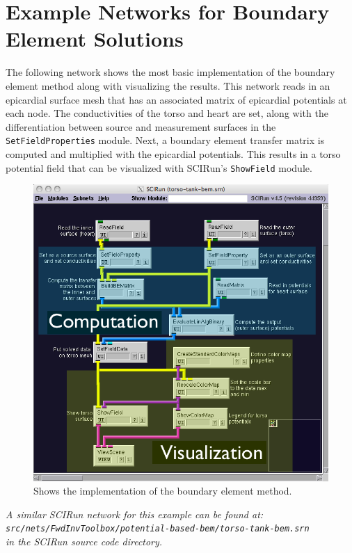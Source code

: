 \section{Example Networks for Boundary Element Solutions}

The following network shows the most basic implementation of the boundary element method
along with visualizing the results. This network reads in an epicardial surface mesh that has an associated matrix of epicardial potentials at each node. The conductivities of the torso and heart
are set, along with the differentiation between source and measurement surfaces in the  {\tt SetFieldProperties} module. Next, a boundary element transfer matrix is computed and multiplied with the epicardial potentials. This results in a torso potential field that can be visualized with SCIRun's {\tt ShowField} module.

\begin{figure}[H]
\begin{center}
\includegraphics[width=\textwidth]{ECGToolkitGuide_figures/BEMnetwork.png}
\caption{Shows the implementation of the boundary element method.}
\label{BEMnet}
\end{center}
\end{figure}

\vspace{5pt}\textit{A similar SCIRun network for this example can be found at:\\{\tt src/nets/FwdInvToolbox/potential-based-bem/torso-tank-bem.srn}\\in the SCIRun source code directory.}\vspace{5pt}

